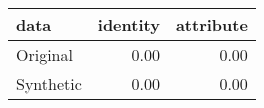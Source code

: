 \begin{tabular}{lrr}
  \toprule
data & identity & attribute \\ 
  \midrule
Original & 0.00 & 0.00 \\ 
  Synthetic & 0.00 & 0.00 \\ 
   \bottomrule
\end{tabular}

